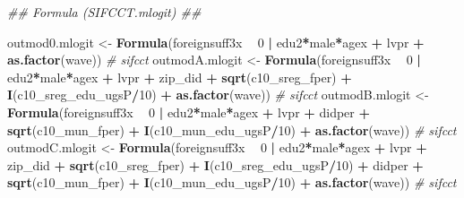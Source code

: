 \documentclass[
]{article}
\newenvironment{Shaded}{\begin{snugshade}}{\end{snugshade}}
\newcommand{\CommentTok}[1]{\textcolor[rgb]{0.56,0.35,0.01}{\textit{#1}}}
\newcommand{\DecValTok}[1]{\textcolor[rgb]{0.00,0.00,0.81}{#1}}
\newcommand{\KeywordTok}[1]{\textcolor[rgb]{0.13,0.29,0.53}{\textbf{#1}}}
\newcommand{\NormalTok}[1]{#1}
\newcommand{\OperatorTok}[1]{\textcolor[rgb]{0.81,0.36,0.00}{\textbf{#1}}}
\newcommand{\StringTok}[1]{\textcolor[rgb]{0.31,0.60,0.02}{#1}}
\begin{document}
\begin{Shaded}
\begin{Highlighting}[]
\CommentTok{## Formula (SIFCCT.mlogit) ##}

\NormalTok{outmod0.mlogit <-}\StringTok{ }\KeywordTok{Formula}\NormalTok{(foreignsuff3x  }\OperatorTok{~}\StringTok{ }\DecValTok{0} \OperatorTok{|}\StringTok{ }\NormalTok{edu2}\OperatorTok{*}\NormalTok{male}\OperatorTok{*}\NormalTok{agex }\OperatorTok{+}\StringTok{ }\NormalTok{lvpr }\OperatorTok{+}\StringTok{  }
\StringTok{                            }\KeywordTok{as.factor}\NormalTok{(wave)) }\CommentTok{# sifcct}
\NormalTok{outmodA.mlogit <-}\StringTok{ }\KeywordTok{Formula}\NormalTok{(foreignsuff3x  }\OperatorTok{~}\StringTok{ }\DecValTok{0} \OperatorTok{|}\StringTok{ }\NormalTok{edu2}\OperatorTok{*}\NormalTok{male}\OperatorTok{*}\NormalTok{agex }\OperatorTok{+}\StringTok{ }\NormalTok{lvpr }\OperatorTok{+}\StringTok{  }
\StringTok{                            }\NormalTok{zip_did }\OperatorTok{+}\StringTok{ }\KeywordTok{sqrt}\NormalTok{(c10_sreg_fper) }\OperatorTok{+}\StringTok{ }\KeywordTok{I}\NormalTok{(c10_sreg_edu_ugsP}\OperatorTok{/}\DecValTok{10}\NormalTok{) }\OperatorTok{+}\StringTok{ }
\StringTok{                            }\KeywordTok{as.factor}\NormalTok{(wave)) }\CommentTok{# sifcct}
\NormalTok{outmodB.mlogit <-}\StringTok{ }\KeywordTok{Formula}\NormalTok{(foreignsuff3x  }\OperatorTok{~}\StringTok{ }\DecValTok{0} \OperatorTok{|}\StringTok{ }\NormalTok{edu2}\OperatorTok{*}\NormalTok{male}\OperatorTok{*}\NormalTok{agex }\OperatorTok{+}\StringTok{ }\NormalTok{lvpr }\OperatorTok{+}\StringTok{  }
\StringTok{                            }\NormalTok{didper }\OperatorTok{+}\StringTok{ }\KeywordTok{sqrt}\NormalTok{(c10_mun_fper) }\OperatorTok{+}\StringTok{ }\KeywordTok{I}\NormalTok{(c10_mun_edu_ugsP}\OperatorTok{/}\DecValTok{10}\NormalTok{) }\OperatorTok{+}\StringTok{ }
\StringTok{                            }\KeywordTok{as.factor}\NormalTok{(wave)) }\CommentTok{# sifcct}
\NormalTok{outmodC.mlogit <-}\StringTok{ }\KeywordTok{Formula}\NormalTok{(foreignsuff3x  }\OperatorTok{~}\StringTok{ }\DecValTok{0} \OperatorTok{|}\StringTok{ }\NormalTok{edu2}\OperatorTok{*}\NormalTok{male}\OperatorTok{*}\NormalTok{agex }\OperatorTok{+}\StringTok{ }\NormalTok{lvpr }\OperatorTok{+}\StringTok{  }
\StringTok{                            }\NormalTok{zip_did }\OperatorTok{+}\StringTok{ }\KeywordTok{sqrt}\NormalTok{(c10_sreg_fper) }\OperatorTok{+}\StringTok{ }\KeywordTok{I}\NormalTok{(c10_sreg_edu_ugsP}\OperatorTok{/}\DecValTok{10}\NormalTok{) }\OperatorTok{+}\StringTok{ }
\StringTok{                            }\NormalTok{didper }\OperatorTok{+}\StringTok{ }\KeywordTok{sqrt}\NormalTok{(c10_mun_fper) }\OperatorTok{+}\StringTok{ }\KeywordTok{I}\NormalTok{(c10_mun_edu_ugsP}\OperatorTok{/}\DecValTok{10}\NormalTok{) }\OperatorTok{+}\StringTok{ }
\StringTok{                            }\KeywordTok{as.factor}\NormalTok{(wave)) }\CommentTok{# sifcct}


\end{Highlighting}
\end{Shaded}
\end{document}
